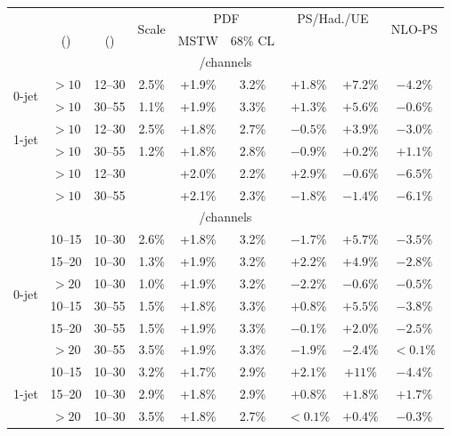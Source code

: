 \begin{table}
	\centering
	\begin{tabular}{ccc|cccccc}
		& \ptsubleadlep & \mll & \multirow{2}{*}{Scale} & \multicolumn{2}{c}{PDF} & \multicolumn{2}{c}{PS/Had./UE} & \multirow{2}{*}{NLO-PS} \\
		& (\GeV) & (\GeV) & & MSTW & 68\% CL & \pythia{6} & \fherwig & \\
		\hline
		\multicolumn{9}{c}{\eech/\mmch channels} \\
		\hline
		\multirow{2}{*}{0-jet}
		&  $>10$ & 12--30 & 2.5\% & +1.9\% & 3.2\% & $+1.8\%$ & $+7.2\%$ & $-4.2\%$ \\
		&  $>10$ & 30--55 & 1.1\% & +1.9\% & 3.3\% & $+1.3\%$ & $+5.6\%$ & $-0.6\%$ \\
		\hline
		\multirow{2}{*}{1-jet}
		&  $>10$ & 12--30 & 2.5\% & +1.8\% & 2.7\% & $-0.5\%$ & $+3.9\%$ & $-3.0\%$ \\
		&  $>10$ & 30--55 & 1.2\% & +1.8\% & 2.8\% & $-0.9\%$ & $+0.2\%$ & $+1.1\%$ \\
		\hline
		\multirow{2}{*}{\twojet}
		&  $>10$ & 12--30 &       & +2.0\% & 2.2\% & $+2.9\%$ & $-0.6\%$ & $-6.5\%$ \\
		&  $>10$ & 30--55 &       & +2.1\% & 2.3\% & $-1.8\%$ & $-1.4\%$ & $-6.1\%$ \\
		\hline
		\multicolumn{9}{c}{\emch/\mech channels} \\
		\hline
		\multirow{6}{*}{0-jet}
	    & 10--15 & 10--30 & 2.6\% & +1.8\% & 3.2\% & $-1.7\%$ & $+5.7\%$ & $-3.5\%$ \\
		& 15--20 & 10--30 & 1.3\% & +1.9\% & 3.2\% & $+2.2\%$ & $+4.9\%$ & $-2.8\%$ \\
		&  $>20$ & 10--30 & 1.0\% & +1.9\% & 3.2\% & $-2.2\%$ & $-0.6\%$ & $-0.5\%$ \\
		& 10--15 & 30--55 & 1.5\% & +1.8\% & 3.3\% & $+0.8\%$ & $+5.5\%$ & $-3.8\%$ \\
		& 15--20 & 30--55 & 1.5\% & +1.9\% & 3.3\% & $-0.1\%$ & $+2.0\%$ & $-2.5\%$ \\
		&  $>20$ & 30--55 & 3.5\% & +1.9\% & 3.3\% & $-1.9\%$ & $-2.4\%$ & $<0.1\%$ \\
		\hline
		\multirow{6}{*}{1-jet}
	    & 10--15 & 10--30 & 3.2\% & +1.7\% & 2.9\% & $+2.1\%$ & $+11\%$  & $-4.4\%$ \\
		& 15--20 & 10--30 & 2.9\% & +1.8\% & 2.9\% & $+0.8\%$ & $+1.8\%$ & $+1.7\%$ \\
		&  $>20$ & 10--30 & 3.5\% & +1.8\% & 2.7\% & $<0.1\%$ & $+0.4\%$ & $-0.3\%$ \\

\end{tabular}
\end{table}
